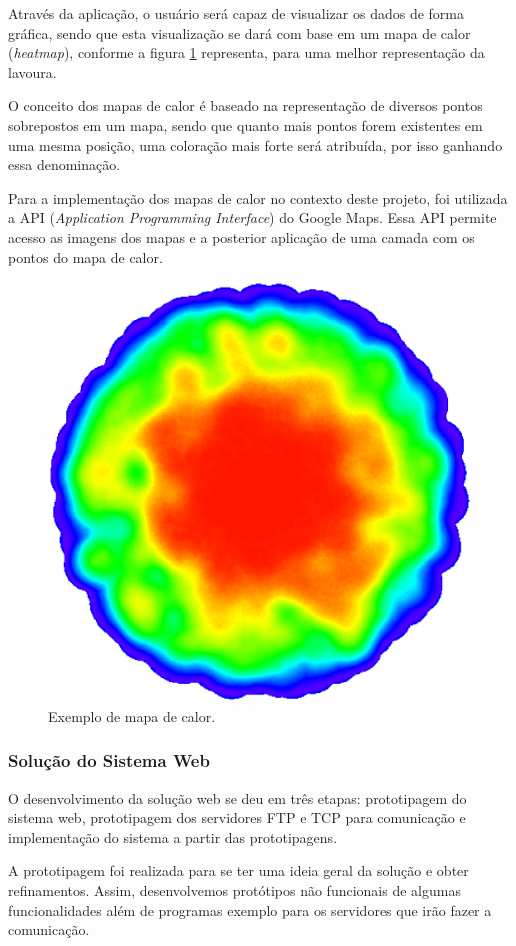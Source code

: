   Através da aplicação, o usuário será capaz de visualizar os dados de forma gráfica,
  sendo que esta visualização se dará com base em um mapa de calor (\textit{heatmap}), conforme a figura \ref{fig:heatmap} representa, para uma melhor representação da lavoura.

  O conceito dos mapas de calor é baseado na representação de diversos pontos sobrepostos em um mapa, sendo que quanto mais pontos
  forem existentes em uma mesma posição, uma coloração mais forte será atribuída, por isso ganhando essa denominação.

  Para a implementação dos mapas de calor no contexto deste projeto, foi utilizada a API (\textit{Application Programming Interface})
  do Google Maps. Essa API permite acesso as imagens dos mapas e a posterior aplicação de uma camada com os pontos do mapa de calor.

  \begin{figure}[!htbp]
  \begin{center}
  \includegraphics[width=.5\textwidth]{figuras/heatmap.eps}
  \caption{\label{fig:heatmap}Exemplo de mapa de calor.}
  \end{center}
  \end{figure}

  \subsubsection{Solução do Sistema Web}
  O desenvolvimento da solução web se deu em três etapas: prototipagem do sistema web,
  prototipagem dos servidores FTP e TCP para comunicação e implementação do sistema
  a partir das prototipagens.

  A prototipagem foi realizada para se ter uma ideia geral da solução e obter 
  refinamentos. Assim, desenvolvemos protótipos não funcionais de algumas funcionalidades
  além de programas exemplo para os servidores que irão fazer a comunicação.

